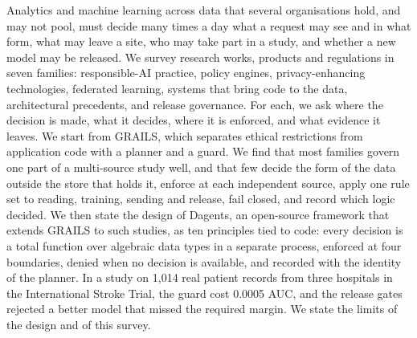 Analytics and machine learning across data that several organisations hold, and
may not pool, must decide many times a day what a request may see and in what
form, what may leave a site, who may take part in a study, and whether a new
model may be released. We survey \SurveyWorks{} research works, products and
regulations in seven families: responsible-AI practice, policy engines,
privacy-enhancing technologies, federated learning, systems that bring code to
the data, architectural precedents, and release governance. For each, we ask
where the decision is made, what it decides, where it is enforced, and what
evidence it leaves. We start from GRAILS, which separates ethical restrictions
from application code with a planner and a guard. We find that most families
govern one part of a multi-source study well, and that few decide the form of
the data outside the store that holds it, enforce at each independent source,
apply one rule set to reading, training, sending and release, fail closed, and
record which logic decided. We then state the design of Dagents, an open-source
framework that extends GRAILS to such studies, as ten principles tied to code:
every decision is a total function over algebraic data types in a separate
process, enforced at four boundaries, denied when no decision is available, and
recorded with the identity of the planner. In a study on 1,014 real patient
records from three hospitals in the International Stroke Trial, the guard cost
0.0005 AUC, and the release gates rejected a better model that missed the
required margin. We state the limits of the design and of this survey.
